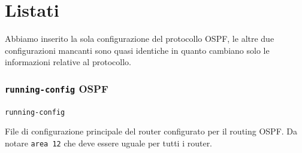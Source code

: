 \documentclass[9pt, a4paper, oneside]{article}
\begin{document}
	\part{Listati}	
		 \par		
		 Abbiamo inserito la sola configurazione del protocollo OSPF, le altre due configurazioni mancanti sono quasi identiche in quanto cambiano solo le informazioni relative al protocollo.		
		 \section{\texttt{running-config} OSPF}
			\par
				\texttt{running-config}
			\par
				File di configurazione principale del router 
				configurato per il routing OSPF. Da notare 
				\texttt{area 12} che deve essere uguale per 
				tutti i router.
			\texttt{}
			\newpage
\end{document}
